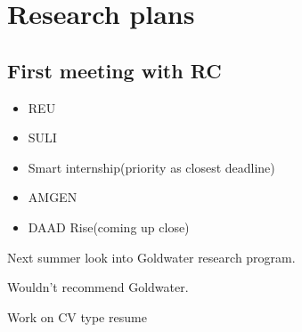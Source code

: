 \chapter{Research plans}

\section{First meeting with RC}
\begin{itemize}
  \item REU
  \item SULI
  \item Smart internship(priority as closest deadline)
  \item AMGEN
  \item DAAD Rise(coming up close)
\end{itemize}

Next summer look into Goldwater research program.

Wouldn't recommend Goldwater.

Work on CV type resume


